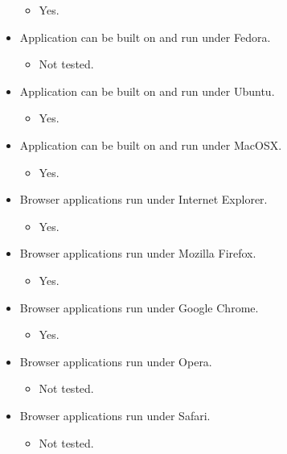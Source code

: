 \begin{itemize}
  \begin{itemize}
  \itemsep1pt\parskip0pt
  \item
    Yes.
  \end{itemize}
\item
  Application can be built on and run under Fedora.

  \begin{itemize}
  \itemsep1pt\parskip0pt
  \item
    Not tested.
  \end{itemize}
\item
  Application can be built on and run under Ubuntu.

  \begin{itemize}
  \itemsep1pt\parskip0pt
  \item
    Yes.
  \end{itemize}
\item
  Application can be built on and run under MacOSX.

  \begin{itemize}
  \itemsep1pt\parskip0pt
  \item
    Yes.
  \end{itemize}
\item
  Browser applications run under Internet Explorer.

  \begin{itemize}
  \itemsep1pt\parskip0pt
  \item
    Yes.
  \end{itemize}
\item
  Browser applications run under Mozilla Firefox.

  \begin{itemize}
  \itemsep1pt\parskip0pt
  \item
    Yes.
  \end{itemize}
\item
  Browser applications run under Google Chrome.

  \begin{itemize}
  \itemsep1pt\parskip0pt
  \item
    Yes.
  \end{itemize}
\item
  Browser applications run under Opera.

  \begin{itemize}
  \itemsep1pt\parskip0pt
  \item
    Not tested.
  \end{itemize}
\item
  Browser applications run under Safari.

  \begin{itemize}
  \itemsep1pt\parskip0pt
  \item
    Not tested.
  \end{itemize}
\end{itemize}

